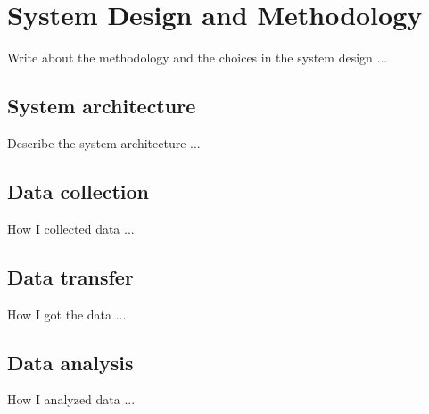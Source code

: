 \chapter{System Design and Methodology}
\label{cha:system}
\vspace{0.5 cm} 

Write about the methodology and the choices in the system design ...


\vspace{0.5 cm} 
\section{System architecture}
\label{sec:collection}
\vspace{0.5 cm} 

Describe the system architecture ...


\vspace{0.5 cm} 
\section{Data collection}
\label{sec:collection}
\vspace{0.5 cm} 

How I collected data ...


\vspace{0.5 cm} 
\section{Data transfer}
\label{sec:transfer}
\vspace{0.5 cm} 

How I got the data ...


\vspace{0.5 cm} 
\section{Data analysis}
\label{sec:analysis}
\vspace{0.5 cm} 

How I analyzed data ...
